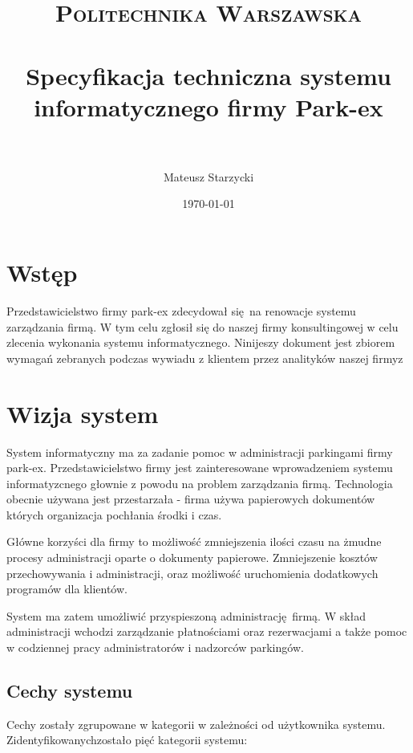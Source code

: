 \documentclass[paper=a4, fontsize=11pt]{scrartcl} %
\title{ 
    \normalfont \normalsize 
    \textsc{Politechnika Warszawska} \\ [25pt] %
    \horrule{0.5pt} \\[0.4cm] %
    \huge Specyfikacja techniczna systemu informatycznego firmy Park-ex\\ %
    \horrule{2pt} \\[0.5cm] %
}
\author{Mateusz Starzycki} %
\date{\normalsize\today} %
\begin{document}
\maketitle %

\newpage

\tableofcontents


\newpage
\section{Wstęp }

Przedstawicielstwo firmy park-ex zdecydował się na renowacje systemu zarządzania firmą.
W tym celu zgłosił się do naszej firmy konsultingowej w celu zlecenia wykonania systemu informatycznego.
Ninijeszy dokument jest zbiorem wymagań zebranych podczas wywiadu z klientem przez analityków naszej firmyz

\section{Wizja system}

System informatyczny ma za zadanie pomoc w administracji parkingami firmy park-ex. Przedstawicielstwo firmy jest zainteresowane 
wprowadzeniem systemu informatyzcnego głownie z powodu na problem zarządzania firmą. Technologia obecnie używana jest
przestarzała - firma używa papierowych dokumentów których organizacja pochłania środki i czas. 

Główne korzyści dla firmy to możliwość zmniejszenia ilości czasu na żmudne procesy administracji oparte o dokumenty papierowe. Zmniejszenie
kosztów przechowywania i administracji, oraz możliwość uruchomienia dodatkowych programów dla klientów.

System ma zatem umożliwić przyspieszoną administrację firmą. W skład administracji wchodzi zarządzanie płatnościami oraz rezerwacjami a także
pomoc w codziennej pracy administratorów i nadzorców parkingów.

\subsection{Cechy systemu}

Cechy zostały zgrupowane w kategorii w zależności od użytkownika systemu.
Zidentyfikowanychzostało pięć kategorii systemu:
\end{document}
